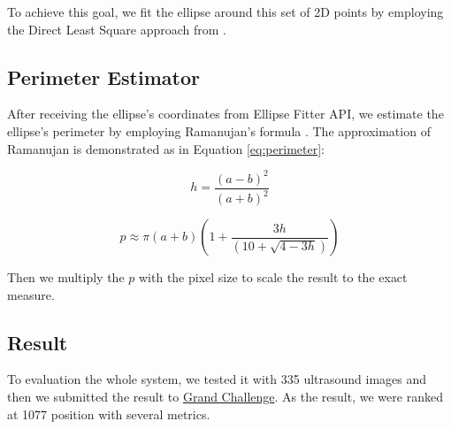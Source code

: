 	To achieve this goal, we fit the ellipse around this set of 2D points by employing the Direct Least Square approach from \cite{direct_ellipse}.
	
\subsection{Perimeter Estimator}
\noindent
	
	After receiving the ellipse's coordinates from Ellipse Fitter API, we estimate the ellipse's perimeter by employing Ramanujan’s formula \cite{perimeter}. The approximation of Ramanujan is demonstrated as in Equation \eqref{eq:perimeter}:
	
	\[ h = \frac{(a-b)^2}{(a+b)^2} \]
	
	\[ p \approx \pi (a+b) (1 + \frac{3h}{(10 + \sqrt{4 - 3h})} ) \label{eq:perimeter} \]

\noindent
	Then we multiply the $p$ with the pixel size to scale the result to the exact measure.
	
\subsection{Result}
\noindent

	To evaluation the whole system, we tested it with 335 ultrasound images and then we submitted the result to  \href{https://hc18.grand-challenge.org/}{Grand Challenge}. As the result, we were ranked at 1077 position with several metrics.
	
